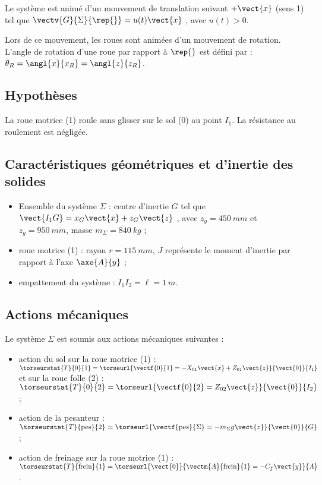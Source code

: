 Le système est animé d’un mouvement de translation
suivant $+\vect{x}$ (sens 1) tel que $\vectv{G}{\Sigma}{\rep{}} = u(t)\vect{x}$ , avec
$u(t) > 0$.

Lors de ce mouvement, les roues sont animées d’un
mouvement de rotation. L’angle de rotation d’une roue
par rapport à $\rep{}$ est défini par : $\theta_R =\angl{x}{x_R}=\angl{z}{z_R}$.



\subsection*{Hypothèses}
La roue motrice (1) roule sans glisser sur le sol (0) au point $I_1$.
La résistance au roulement est négligée.

\subsection*{Caractéristiques géométriques et d’inertie des solides}
\begin{itemize}
\item Ensemble du système $\Sigma$ : centre d’inertie $G$ tel que $\vect{I_1 G} = x_G\vect{x} + z_G\vect{z}$ , avec $z_g = \SI{450}{mm}$ et
$z_g = \SI{950}{mm}$, masse $m_{\Sigma} = \SI{840}{kg}$ ;
\item roue motrice (1) : rayon $r = \SI{115}{mm}$, $J$ représente le moment d’inertie par rapport à l’axe
$\axe{A}{y}$ ;
\item empattement du système : $I_1I_2 =\ell = \SI{1}{m}$.
\end{itemize}

\subsection*{Actions mécaniques}

Le système $\Sigma$ est soumis aux actions mécaniques suivantes :
\begin{itemize}
\item action du sol sur la roue motrice (1) : 
$\torseurstat{T}{0}{1} = \torseurl{\vectf{0}{1}=-X_{01}\vect{x}+Z_{01}\vect{z}}{\vect{0}}{I_1}$
et sur la roue folle (2) : 
$\torseurstat{T}{0}{2} = \torseurl{\vectf{0}{2}=Z_{02}\vect{z}}{\vect{0}}{I_2}$;
\item action de la pesanteur : 
$\torseurstat{T}{\text{pes}}{2} = \torseurl{\vectf{\text{pes}}{\Sigma}=-m_{\Sigma}g\vect{z}}{\vect{0}}{G}$;
\item action de freinage sur la roue motrice (1) : 
$\torseurstat{T}{\text{frein}}{1} = \torseurl{\vect{0}}{\vectm{A}{\text{frein}}{1}=-C_{f}\vect{y}}{A}$.
\end{itemize}


